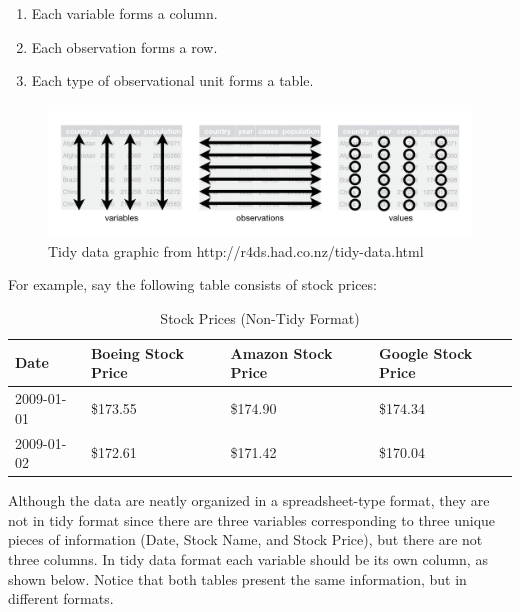 \documentclass[12pt,]{krantz}
\providecommand{\tightlist}{%
  \setlength{\itemsep}{0pt}\setlength{\parskip}{0pt}}
\renewenvironment{quote}{\begin{VF}}{\end{VF}}
\theoremstyle{definition}
\theoremstyle{definition}
\theoremstyle{definition}
\theoremstyle{remark}
\begin{document}
\begin{quote}
\begin{enumerate}
\def\labelenumi{\arabic{enumi}.}
\tightlist
\item
  Each variable forms a column.
\item
  Each observation forms a row.
\item
  Each type of observational unit forms a table.
\end{enumerate}
\end{quote}

\begin{figure}

{\centering \includegraphics[width=\textwidth]{images/tidy-1} 

}

\caption{Tidy data graphic from http://r4ds.had.co.nz/tidy-data.html}\label{fig:tidyfig}
\end{figure}

For example, say the following table consists of stock prices:

\begin{table}[H]

\caption{\label{tab:unnamed-chunk-61}Stock Prices (Non-Tidy Format)}
\centering
\fontsize{10}{12}\selectfont
\begin{tabular}[t]{llll}
\toprule
Date & Boeing Stock Price & Amazon Stock Price & Google Stock Price\\
\midrule
2009-01-01 & \$173.55 & \$174.90 & \$174.34\\
2009-01-02 & \$172.61 & \$171.42 & \$170.04\\
\bottomrule
\end{tabular}
\end{table}

Although the data are neatly organized in a spreadsheet-type format,
they are not in tidy format since there are three variables
corresponding to three unique pieces of information (Date, Stock Name,
and Stock Price), but there are not three columns. In tidy data format
each variable should be its own column, as shown below. Notice that both
tables present the same information, but in different formats.
\end{document}
